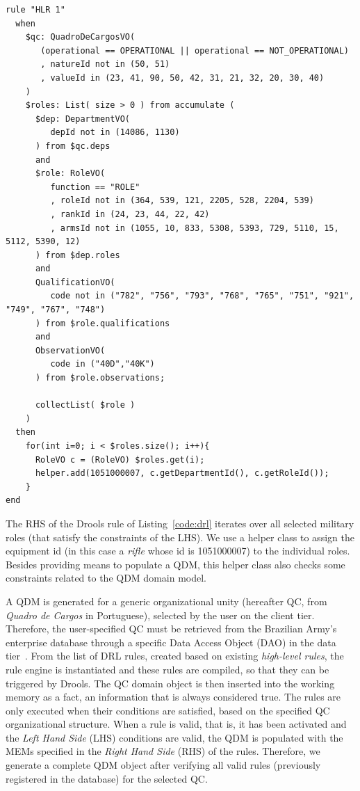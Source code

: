 \documentclass[AMA,STIX1COL,hidelinks]{WileyNJD-v2}
\newcommand{\callers}{\emph{high-level rules}\xspace}
\begin{document}
\begin{lstlisting}[frame=single, float=*t, language=DRL, caption=Example of a \emph{low-level Drools rule}, label={code:drl}]
rule "HLR 1"   	
  when
    $qc: QuadroDeCargosVO( 
       (operational == OPERATIONAL || operational == NOT_OPERATIONAL)
       , natureId not in (50, 51)
       , valueId in (23, 41, 90, 50, 42, 31, 21, 32, 20, 30, 40) 
    )	
    $roles: List( size > 0 ) from accumulate ( 
      $dep: DepartmentVO(
         depId not in (14086, 1130)
      ) from $qc.deps 
      and
      $role: RoleVO(
         function == "ROLE"
         , roleId not in (364, 539, 121, 2205, 528, 2204, 539) 
         , rankId in (24, 23, 44, 22, 42) 
         , armsId not in (1055, 10, 833, 5308, 5393, 729, 5110, 15, 5112, 5390, 12) 
      ) from $dep.roles 
      and  		
      QualificationVO(
         code not in ("782", "756", "793", "768", "765", "751", "921", "749", "767", "748")
      ) from $role.qualifications
      and
      ObservationVO(
         code in ("40D","40K")
      ) from $role.observations;
	
      collectList( $role )
    )	 		
  then		 
    for(int i=0; i < $roles.size(); i++){       	
      RoleVO c = (RoleVO) $roles.get(i);
      helper.add(1051000007, c.getDepartmentId(), c.getRoleId());
    }
end
\end{lstlisting}

The RHS of the Drools rule of Listing~\ref{code:drl} iterates over all selected military roles (that satisfy the constraints of the LHS). We use a helper class to assign the equipment id (in this case a \emph{rifle} whose id is 1051000007) to the individual roles. Besides providing means to populate a QDM, this helper class also checks some constraints related to the QDM domain model. 



A QDM is generated for a generic organizational unity (hereafter QC, from \emph{Quadro de Cargos} in Portuguese), selected by the user on the client tier. Therefore, the user-specified QC must be retrieved from the Brazilian Army's enterprise database through a specific Data Access Object (DAO) in the data tier~\cite{alur2003}. From the list of DRL rules, created based on existing \callers, the rule engine is instantiated and these rules are compiled, so that they can be triggered by Drools. The QC domain object is then inserted into the working memory as a fact, an information that is always considered true. The rules are only executed when their conditions are satisfied, based on the specified QC organizational structure. When a rule is valid, that is, it has been activated and the \emph{Left Hand Side} (LHS) conditions are valid, the QDM is populated with the MEMs specified in the \emph{Right Hand Side} (RHS) of the rules. Therefore, we generate a complete QDM object after verifying all valid rules (previously registered in the database) for the selected QC. 
\end{document}
